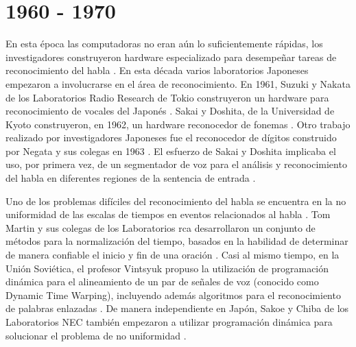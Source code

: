 \section{1960 - 1970}
\label{sec:60s}

En esta \'{e}poca las computadoras no eran a\'un lo suficientemente r\'{a}pidas, los investigadores
construyeron hardware especializado para desempe\~{n}ar tareas de reconocimiento del habla \cite{Furui50Years2004}.
En esta d\'{e}cada varios laboratorios Japoneses empezaron a involucrarse en el \'{a}rea de reconocimiento. En 1961,
Suzuki y Nakata de los Laboratorios Radio Research de Tokio construyeron un hardware para reconocimiento de vocales
del Japon\'{e}s \cite{SuzukiRecognition1961}. Sakai y Doshita, de la Universidad de Kyoto construyeron, en 1962, un
hardware reconocedor de fonemas \cite{SakaiThePhonetic1962}. Otro trabajo realizado por investigadores Japoneses fue
el reconocedor de d\'{i}gitos construido por Negata y sus colegas en 1963 \cite{NagataSpoken1963}. El esfuerzo de
Sakai y Doshita implicaba el uso, por primera vez, de un segmentador de voz para el an\'{a}lisis y reconocimiento
del habla en diferentes regiones de la sentencia de entrada \cite{JaisalAReview2012}.

Uno de los problemas dif\'{i}ciles del reconocimiento del habla se encuentra en la no uniformidad de las escalas de
tiempos en eventos relacionados al habla \cite{Furui50Years2004}. Tom Martin y sus colegas de los Laboratorios \gls{rca}
desarrollaron un conjunto de m\'{e}todos para la normalizaci\'{o}n del tiempo, basados en la habilidad de determinar
de manera confiable el inicio y fin de una oraci\'{o}n \cite{MartinSpeech1964}. Casi al mismo tiempo, en la Uni\'{o}n
Sovi\'{e}tica, el profesor Vintsyuk propuso la utilizaci\'{o}n de programaci\'{o}n din\'{a}mica para el alineamiento de un par
de se\~{n}ales de voz (conocido como Dynamic Time Warping), incluyendo adem\'{a}s algoritmos para el 
reconocimiento de palabras enlazadas \cite{VintsyukSpeech1968}. De manera independiente en Jap\'{o}n, Sakoe y Chiba de los
Laboratorios NEC tambi\'{e}n empezaron a utilizar programaci\'{o}n din\'{a}mica para solucionar el problema de no uniformidad
\cite{SakoeDynamic1978}.
